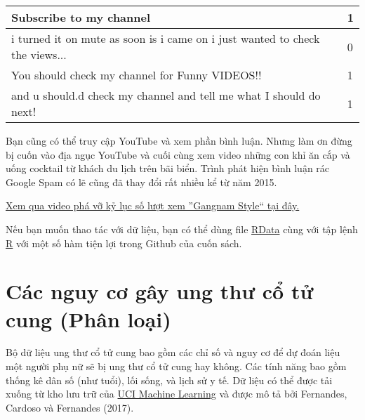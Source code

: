 \begin{table}[]
\begin{tabular}{|l|l|}
Subscribe to my channel                                                                                                                                                                                            & 1     \\ \hline
i turned it on mute as soon is i came on i just wanted to check the views...                                                                                                                                       & 0     \\ \hline
You should check my channel for Funny VIDEOS!!                                                                                                                                                                     & 1     \\ \hline
and u should.d check my channel and tell me what I should do next!                                                                                                                                                 & 1     \\ \hline
\end{tabular}
\end{table}

Bạn cũng có thể truy cập YouTube và xem phần bình luận. Nhưng làm ơn đừng bị cuốn vào địa ngục YouTube và cuối cùng xem video những con khỉ ăn cắp và uống cocktail từ khách du lịch trên bãi biển. Trình phát hiện bình luận rác Google Spam có lẽ cũng đã thay đổi rất nhiều kể từ năm 2015.

\href{https://www.youtube.com/watch?v=9bZkp7q19f0&feature=player_embedded}{Xem qua video phá vỡ kỷ lục số lượt xem ''Gangnam Style`` tại đây.}

Nếu bạn muốn thao tác với dữ liệu, bạn có thể dùng file \href{https://github.com/christophM/interpretable-ml-book/blob/master/data/ycomments.RData}{RData} cùng với tập lệnh \href{https://github.com/christophM/interpretable-ml-book/blob/master/R/get-SpamTube-dataset.R}{R} với một số hàm tiện lợi trong Github của cuốn sách.

\section{Các nguy cơ gây ung thư cổ tử cung (Phân loại)} \label{chap_3.3}
Bộ dữ liệu ung thư cổ tử cung bao gồm các chỉ số và nguy cơ để dự đoán liệu một người phụ nữ sẽ bị ung thư cổ tử cung hay không. Các tính năng bao gồm thống kê dân số (như tuổi), lối sống, và lịch sử y tế. Dữ liệu có thể được tải xuống từ kho lưu trữ của \href{https://archive.ics.uci.edu/ml/datasets/Cervical+cancer+\%28Risk+Factors\%29}{UCI Machine Learning} và được mô tả bởi Fernandes, Cardoso và Fernandes (2017).

